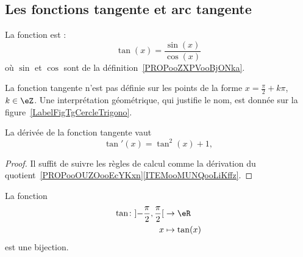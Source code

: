 	\subsection{Les fonctions tangente et arc tangente}

	\begin{definition}
		La fonction  est :
		\begin{equation}
			\tan(x)=\frac{ \sin(x) }{ \cos(x) }
		\end{equation}
		où \( \sin\) et \( \cos\) sont de la définition~\ref{PROPooZXPVooBjONka}.
	\end{definition}
	La fonction tangente n'est pas définie sur les points de la forme \( x=\frac{ \pi }{2}+k\pi\), \( k\in \eZ\). Une interprétation géométrique, qui justifie le nom, est donnée sur la figure~\ref{LabelFigTgCercleTrigono}.
	\newcommand{\CaptionFigTgCercleTrigono}{Interprétation géométrique de la fonction tangente. La tangente de l'angle \( \theta\) est positive (et un peu plus grande que \( 1\)) tandis que celle de la tangente de l'angle \( \varphi\) est négative.}
	

	\begin{lemma}		\label{LEMooYAMFooXCLXfr}
		La dérivée de la fonction tangente vaut
		\begin{equation}
			\tan'(x)=\tan^2(x)+1,
		\end{equation}
	\end{lemma}

	\begin{proof}
		Il suffit de suivre les règles de calcul comme la dérivation du quotient~\ref{PROPooOUZOooEcYKxn}\ref{ITEMooMUNQooLiKffz}.
	\end{proof}

	\begin{proposition}
		La fonction
		\begin{equation}
			\begin{aligned}
				\tan\colon \mathopen] -\frac{ \pi }{ 2 } , \frac{ \pi }{2} \mathclose[ & \to \eR         \\
				x                                                                      & \mapsto \tan(x)
			\end{aligned}
		\end{equation}
		est une bijection.
	\end{proposition}

